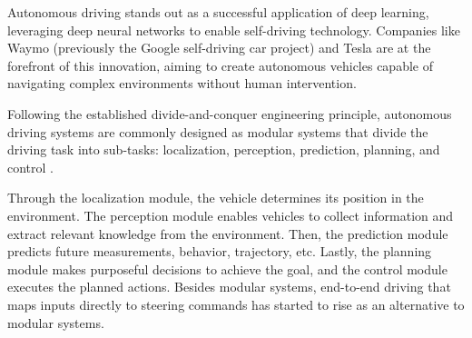 

Autonomous driving stands out as a successful application of deep learning, leveraging deep neural networks to enable self-driving technology. Companies like Waymo (previously the Google self-driving car project) and Tesla are at the forefront of this innovation, aiming to create autonomous vehicles capable of navigating complex environments without human intervention.


Following the established divide-and-conquer engineering principle, autonomous driving systems are commonly designed as modular systems that divide the driving task into sub-tasks: localization, perception, prediction, planning, and control \citep{pendleton2017perception}. 

Through the localization module, the vehicle determines its position in the environment. The perception module enables vehicles to collect information and extract relevant knowledge from the environment. Then, the prediction module predicts future measurements, behavior, trajectory, etc. Lastly, the planning module makes purposeful decisions to achieve the goal, and the control module executes the planned actions. Besides modular systems, end-to-end driving that maps inputs directly to steering commands has started to rise as an alternative to modular systems.

